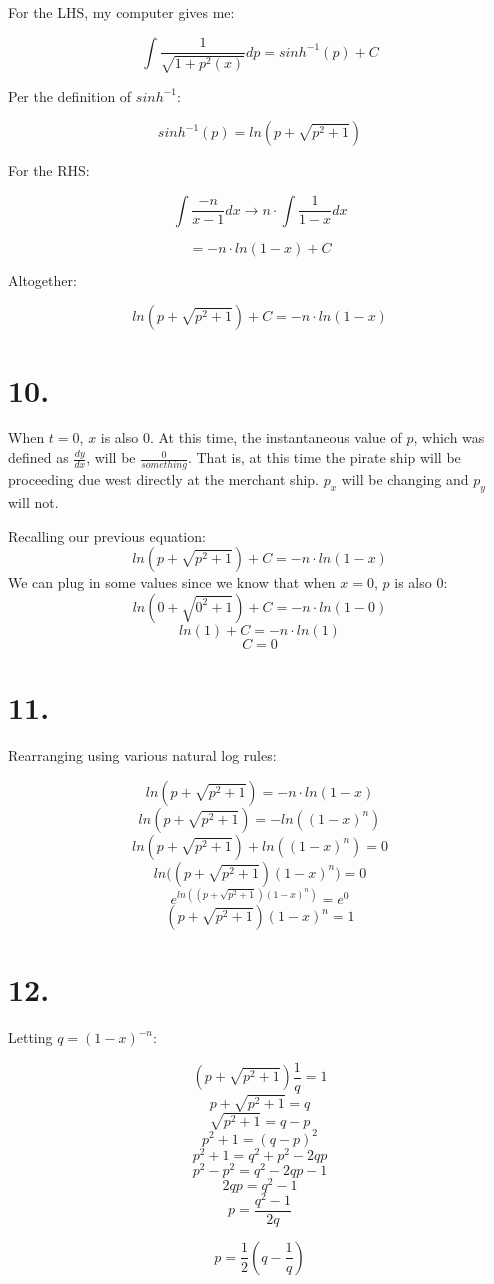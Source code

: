 \documentclass[11pt]{report}
\begin{document}
For the LHS, my computer gives me:

$$
\int \frac{1}{\sqrt{1 + p^2(x)}} dp
=
sinh^{-1}(p) + C
$$

Per the definition of $sinh^{-1}$:

$$
sinh^{-1}(p) = ln(p + \sqrt{p^2 + 1})
$$

For the RHS:

$$
\int \frac{-n}{x-1} dx
\rightarrow
n \cdot \int \frac{1}{1-x} dx
$$

$$ = -n \cdot ln(1-x) + C $$

Altogether:

$$
ln(p + \sqrt{p^2 + 1}) + C
=
-n \cdot ln(1-x)
$$

\section*{10.}

When $t=0$, $x$ is also $0$. At this time, the instantaneous value of $p$, which was
defined as $\frac{dy}{dx}$, will be $\frac{0}{something}$. That is, at this time
the pirate ship will be proceeding due west directly at the merchant ship.
$p_x$ will be changing and $p_y$ will not.

Recalling our previous equation:
$$
ln(p + \sqrt{p^2 + 1}) + C
=
-n \cdot ln(1-x)
$$
We can plug in some values since we know that when $x=0$, $p$ is also $0$:
$$
ln(0 + \sqrt{0^2 + 1}) + C
=
-n \cdot ln(1-0)
$$
$$ ln(1) + C = -n \cdot ln(1) $$
$$ C = 0 $$

\section*{11.}

Rearranging using various natural log rules:

$$ ln(p + \sqrt{p^2 + 1}) = -n \cdot ln(1-x) $$
$$ ln(p + \sqrt{p^2 + 1}) = -ln((1-x)^n) $$
$$ ln(p + \sqrt{p^2 + 1}) + ln((1-x)^n) = 0 $$
$$ ln\Big((p + \sqrt{p^2 + 1}) (1-x)^n \Big) = 0 $$
$$ e^{ln((p + \sqrt{p^2 + 1}) (1-x)^n )} = e^0 $$
$$(p + \sqrt{p^2 + 1}) (1-x)^n = 1$$

\section*{12.}

Letting $q=(1-x)^{-n}$:

$$(p + \sqrt{p^2 + 1}) \frac{1}{q} = 1$$
$$p + \sqrt{p^2 + 1} = q$$
$$\sqrt{p^2 + 1} = q - p$$
$$p^2 + 1 = (q - p)^2$$
$$p^2 + 1 = q^2 + p^2 - 2qp$$
$$p^2 - p^2 = q^2 - 2qp - 1$$
$$2qp = q^2 - 1$$
$$p = \frac{q^2 - 1}{2q}$$

$$p = \frac{1}{2}(q - \frac{1}{q})$$
\end{document}
